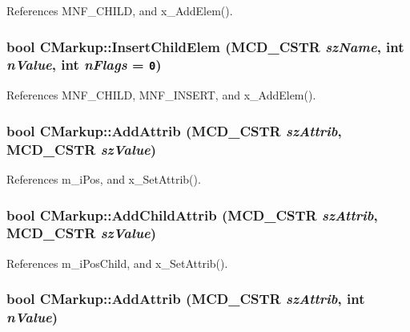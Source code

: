 References MNF\_\-CHILD, and x\_\-AddElem().
\subsubsection[InsertChildElem]{\setlength{\rightskip}{0pt plus 5cm}bool CMarkup::InsertChildElem ({\bf MCD\_\-CSTR} {\em szName}, \/  int {\em nValue}, \/  int {\em nFlags} = {\tt 0})\hspace{0.3cm}{\tt  [inline]}}\label{classCMarkup_91c3a9a4a47a3c8c9e184d9a6ee7f97a}




References MNF\_\-CHILD, MNF\_\-INSERT, and x\_\-AddElem().
\subsubsection[AddAttrib]{\setlength{\rightskip}{0pt plus 5cm}bool CMarkup::AddAttrib ({\bf MCD\_\-CSTR} {\em szAttrib}, \/  {\bf MCD\_\-CSTR} {\em szValue})\hspace{0.3cm}{\tt  [inline]}}\label{classCMarkup_0e563a8e5187c6145ef7da0eda8f48a0}




References m\_\-iPos, and x\_\-SetAttrib().
\subsubsection[AddChildAttrib]{\setlength{\rightskip}{0pt plus 5cm}bool CMarkup::AddChildAttrib ({\bf MCD\_\-CSTR} {\em szAttrib}, \/  {\bf MCD\_\-CSTR} {\em szValue})\hspace{0.3cm}{\tt  [inline]}}\label{classCMarkup_abf8a4d65e8d1e24dab3f3299c82a51b}




References m\_\-iPosChild, and x\_\-SetAttrib().
\subsubsection[AddAttrib]{\setlength{\rightskip}{0pt plus 5cm}bool CMarkup::AddAttrib ({\bf MCD\_\-CSTR} {\em szAttrib}, \/  int {\em nValue})\hspace{0.3cm}{\tt  [inline]}}\label{classCMarkup_003a55d86bd2c78646abd3f408bd4acb}




